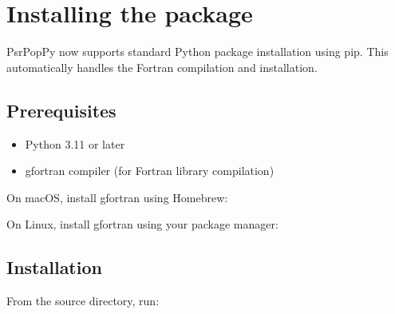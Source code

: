 \documentclass[letterpaper,10pt,english]{sphinxmanual}
\begin{document}
\section{Installing the package}
\label{\detokenize{installation:installing-the-package}}\label{\detokenize{installation:installing-package}}
\sphinxAtStartPar
PsrPopPy now supports standard Python package installation using pip.
This automatically handles the Fortran compilation and installation.


\subsection{Prerequisites}
\label{\detokenize{installation:prerequisites}}\begin{itemize}
\item {} 
\sphinxAtStartPar
Python 3.11 or later

\item {} 
\sphinxAtStartPar
gfortran compiler (for Fortran library compilation)

\end{itemize}

\sphinxAtStartPar
On macOS, install gfortran using Homebrew:

\begin{sphinxVerbatim}[commandchars=\\\{\}]
  
\end{sphinxVerbatim}

\sphinxAtStartPar
On Linux, install gfortran using your package manager:

\begin{sphinxVerbatim}[commandchars=\\\{\}]
   

     
\end{sphinxVerbatim}


\subsection{Installation}
\label{\detokenize{installation:id2}}
\sphinxAtStartPar
From the source directory, run:

\begin{sphinxVerbatim}[commandchars=\\\{\}]
  
\end{sphinxVerbatim}
\end{document}
